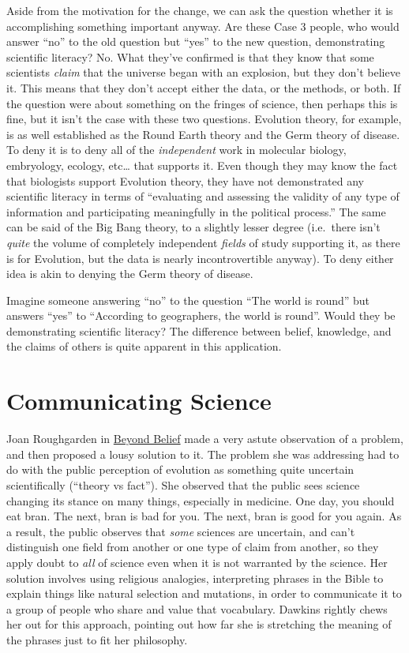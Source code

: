 Aside from the motivation for the change, we can ask the question
whether it is accomplishing something important anyway. Are these Case 3
people, who would answer ``no'' to the old question but ``yes'' to the
new question, demonstrating scientific literacy?  No.  What they've confirmed is that they know that some scientists \emph{claim}
that the universe began with an explosion, but they don't believe it.
This means that they don't accept either the data, or the methods, or both. If
the question were about something on the fringes of science, then
perhaps this is fine, but it isn't the case with these two questions.
Evolution theory, for example, is as well established as the Round Earth
theory and the Germ theory of disease. To deny it is to deny all of the
\emph{independent} work in molecular biology, embryology, ecology,
etc\ldots{} that supports it. Even though they may know the fact that
biologists support Evolution theory, they have not demonstrated any
scientific literacy in terms of ``evaluating and assessing the validity
of any type of information and participating meaningfully in the
political process.'' The same can be said of the Big Bang theory, to a
slightly lesser degree (i.e.~there isn't \emph{quite} the volume of
completely independent \emph{fields} of study supporting it, as there is
for Evolution, but the data is nearly incontrovertible anyway). To deny
either idea is akin to denying the Germ theory of disease.

Imagine someone answering ``no'' to the question ``The world is round''
but answers ``yes'' to ``According to geographers, the world is round''.
Would they be demonstrating scientific literacy?  The difference between belief, knowledge, and the claims of others is quite apparent in this application.


\section{Communicating Science}

Joan Roughgarden in
\href{http://thesciencenetwork.org/programs/beyond-belief-science-religion-reason-and-survival}{Beyond
Belief} made a very astute observation of a problem, and then proposed a
lousy solution to it. The problem she was addressing had to do with the
public perception of evolution as something quite uncertain
scientifically (``theory vs fact''). She observed that the public sees
science changing its stance on many things, especially in medicine. One
day, you should eat bran. The next, bran is bad for you. The next, bran
is good for you again. As a result, the public observes that \emph{some}
sciences are uncertain, and can't distinguish one field from another or
one type of claim from another, so they apply doubt to \emph{all} of
science even when it is not warranted by the science. Her solution
involves using religious analogies, interpreting phrases in the Bible to
explain things like natural selection and mutations, in order to
communicate it to a group of people who share and value that vocabulary.
Dawkins rightly chews her out for this approach, pointing out how far
she is stretching the meaning of the phrases just to fit her philosophy.


